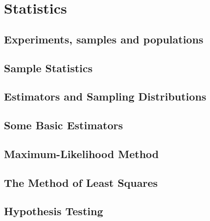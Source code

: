 \chapter{Statistics}
\section{Experiments, samples and populations}
\section{Sample Statistics}
\section{Estimators and Sampling Distributions}
\section{Some Basic Estimators}
\section{Maximum-Likelihood Method}
\section{The Method of Least Squares}
\section{Hypothesis Testing}
